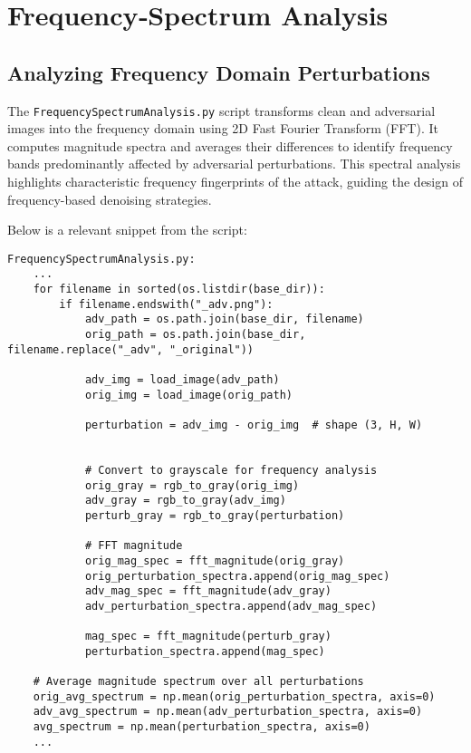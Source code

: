 \documentclass[a4paper,12pt]{report}%
\begin{document}
\chapter{Frequency‑Spectrum Analysis}
\section{Analyzing Frequency Domain Perturbations}
The \texttt{FrequencySpectrumAnalysis.py} script transforms clean and adversarial images into the frequency domain using 2D Fast Fourier Transform (FFT). It computes magnitude spectra and averages their differences to identify frequency bands predominantly affected by adversarial perturbations. This spectral analysis highlights characteristic frequency fingerprints of the attack, guiding the design of frequency-based denoising strategies.

Below is a relevant snippet from the script:

\begin{verbatim}
FrequencySpectrumAnalysis.py:
    ...
    for filename in sorted(os.listdir(base_dir)):
        if filename.endswith("_adv.png"):
            adv_path = os.path.join(base_dir, filename)
            orig_path = os.path.join(base_dir, filename.replace("_adv", "_original"))

            adv_img = load_image(adv_path)
            orig_img = load_image(orig_path)

            perturbation = adv_img - orig_img  # shape (3, H, W)


            # Convert to grayscale for frequency analysis
            orig_gray = rgb_to_gray(orig_img)
            adv_gray = rgb_to_gray(adv_img)
            perturb_gray = rgb_to_gray(perturbation)

            # FFT magnitude
            orig_mag_spec = fft_magnitude(orig_gray)
            orig_perturbation_spectra.append(orig_mag_spec)
            adv_mag_spec = fft_magnitude(adv_gray)
            adv_perturbation_spectra.append(adv_mag_spec)

            mag_spec = fft_magnitude(perturb_gray)
            perturbation_spectra.append(mag_spec)

    # Average magnitude spectrum over all perturbations
    orig_avg_spectrum = np.mean(orig_perturbation_spectra, axis=0)
    adv_avg_spectrum = np.mean(adv_perturbation_spectra, axis=0)
    avg_spectrum = np.mean(perturbation_spectra, axis=0)
    ...
\end{verbatim}
\end{document}
